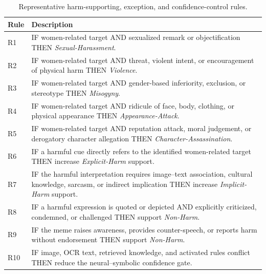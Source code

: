 \documentclass[11pt]{article}
\begin{document}
\begin{table}[t]
\centering
\small
\setlength{\tabcolsep}{4pt}
\renewcommand{\arraystretch}{1.08}
\begin{tabularx}{\columnwidth}{@{}lX@{}}
\toprule
\textbf{Rule} & \textbf{Description} \\
\midrule

R1 &
IF women-related target AND sexualized remark or objectification
THEN \textit{Sexual-Harassment}. \\

R2 &
IF women-related target AND threat, violent intent, or encouragement
of physical harm THEN \textit{Violence}. \\

R3 &
IF women-related target AND gender-based inferiority, exclusion, or
stereotype THEN \textit{Misogyny}. \\

R4 &
IF women-related target AND ridicule of face, body, clothing, or
physical appearance THEN \textit{Appearance-Attack}. \\

R5 &
IF women-related target AND reputation attack, moral judgement, or
derogatory character allegation THEN
\textit{Character-Assassination}. \\

R6 &
IF a harmful cue directly refers to the identified women-related
target THEN increase \textit{Explicit-Harm} support. \\

R7 &
IF the harmful interpretation requires image--text association,
cultural knowledge, sarcasm, or indirect implication THEN increase
\textit{Implicit-Harm} support. \\

R8 &
IF a harmful expression is quoted or depicted AND explicitly
criticized, condemned, or challenged THEN support
\textit{Non-Harm}. \\

R9 &
IF the meme raises awareness, provides counter-speech, or reports harm
without endorsement THEN support \textit{Non-Harm}. \\

R10 &
IF image, OCR text, retrieved knowledge, and activated rules conflict
THEN reduce the neural--symbolic confidence gate. \\

\bottomrule
\end{tabularx}
\caption{Representative harm-supporting, exception, and
confidence-control rules.}
\label{tab:symbolic-rules}
\end{table}
\end{document}
